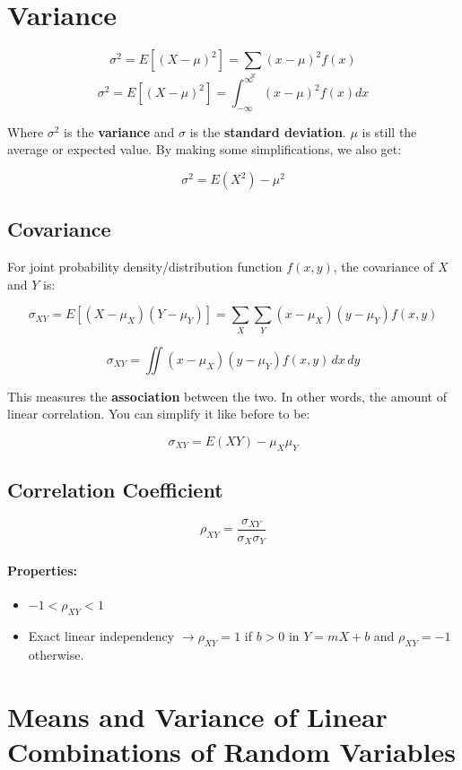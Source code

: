 \documentclass[a4paper,12pt]{report}
\begin{document}
\section{Variance}

$$\sigma^2 = E[(X-\mu)^2] = \sum_x (x-\mu)^2f(x)$$
$$\sigma^2 = E[(X-\mu)^2] = \int_{-\infty}^{\infty} (x-\mu)^2f(x)dx$$

Where $\sigma^2$ is the \textbf{variance} and $\sigma$ is the \textbf{standard deviation}. $\mu$ is still the average or expected value. By making some simplifications, we also get:

$$\sigma^2 = E(X^2)-\mu^2$$

\subsection{Covariance}

For joint probability density/distribution function $f(x, y)$, the covariance of $X$ and $Y$ is:

$$\sigma_{XY} = E[(X-\mu_X)(Y-\mu_Y)] = \sum_X\sum_Y(x-\mu_X)(y-\mu_Y)f(x, y)$$

$$\sigma_{XY} = \iint (x-\mu_X)(y-\mu_Y)f(x,y)\,dx\,dy$$

This measures the \textbf{association} between the two. In other words, the amount of linear correlation. You can simplify it like before to be:

$$\sigma_{XY} = E(XY) - \mu_X\mu_Y$$

\subsection{Correlation Coefficient}

$$\rho_{XY} = \frac{\sigma_{XY}}{\sigma_X\sigma_Y}$$

\paragraph{Properties:}
\begin{itemize}
\item $-1<\rho_{XY}<1$
\item Exact linear independency $\to \rho_{XY} = 1$ if $b>0$ in $Y = mX + b$ and $\rho_{XY} = -1$ otherwise.
\end{itemize}

\section{Means and Variance of Linear Combinations of Random Variables}
\end{document}
